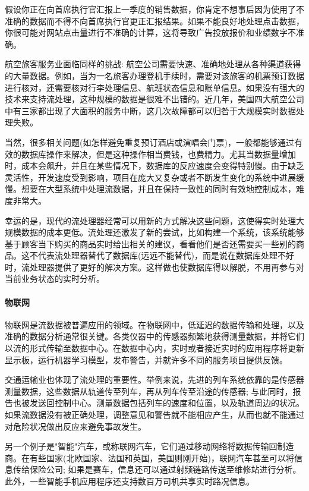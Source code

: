 \documentclass{ctexart}
\begin{document}
假设你正在向首席执行官汇报上一季度的销售数据，你肯定不想事后因为使用了不准确的数据而不得不向首席执行官更正汇报结果。如果不能良好地处理点击数据，你很可能对网站点击量进行不准确的计算，这将导致广告投放报价和业绩数字不准确。

航空旅客服务业面临同样的挑战: 航空公司需要快速、准确地处理从各种渠道获得的大量数据。例如，当为一名旅客办理登机手续时，需要对该旅客的机票预订数据进行核对，还需要核对行李处理信息、航班状态信息和账单信息。如果没有强大的技术来支持流处理，这种规模的数据是很难不出错的。近几年，美国四大航空公司中有三家都出现了大面积的服务中断，这几次故障都可以归咎于大规模实时数据处理失败。

当然，很多相关问题(如怎样避免重复预订酒店或演唱会门票)，一般都能够通过有效的数据库操作来解决，但是这种操作相当费钱，也费精力。尤其当数据量增加时，成本会飙升，并且在某些情况下，数据库的反应速度会变得特别慢。由于缺乏灵活性，开发速度受到影响，项目在庞大又复杂或者不断发生变化的系统中进展缓慢。想要在大型系统中处理流数据，并且在保持一致性的同时有效地控制成本，难度非常大。

幸运的是，现代的流处理器经常可以用新的方式解决这些问题，这使得实时处理大规模数据的成本更低。流处理还激发了新的尝试，比如构建一个系统，该系统能够基于顾客当下购买的商品实时给出相关的建议，看看他们是否还需要买一些别的商品。这不代表流处理器替代了数据库(远远不能替代)，而是说在数据库处理不好时，流处理器提供了更好的解决方案。这样做也使数据库得以解脱，不用再参与对当前业务状态的实时分析。

\paragraph{物联网}

物联网是流数据被普遍应用的领域。在物联网中，低延迟的数据传输和处理，以及准确的数据分析通常很关键。各类仪器中的传感器频繁地获得测量数据，并将它们以流的形式传输至数据中心。在数据中心内，实时或者接近实时的应用程序将更新显示板，运行机器学习模型，发布警告，并就许多不同的服务项目提供反馈。

交通运输业也体现了流处理的重要性。举例来说，先进的列车系统依靠的是传感器测量数据，这些数据从轨道传至列车，再从列车传至沿途的传感器; 与此同时，报告也被发送回控制中心。测量数据包括列车的速度和位置，以及轨道周边的状况。如果流数据没有被正确处理，调整意见和警告就不能相应产生，从而也就不能通过对危险状况做出反应来避免事故发生。

另一个例子是"智能"汽车，或称联网汽车，它们通过移动网络将数据传输回制造商。在有些国家(北欧国家、法国和英国，美国则刚开始)，联网汽车甚至可以将信息传给保险公司; 如果是赛车，信息还可以通过射频链路传送至维修站进行分析。此外，一些智能手机应用程序还支持数百万司机共享实时路况信息。
\end{document}

